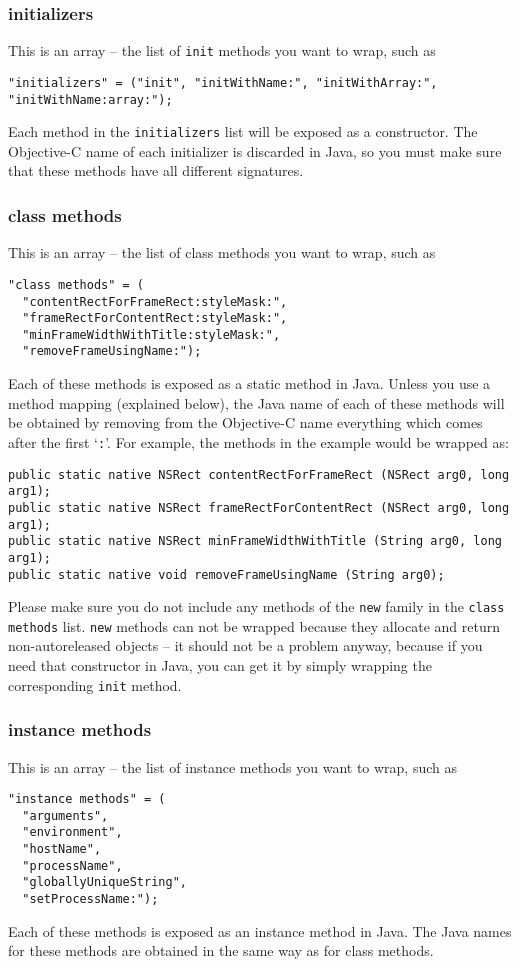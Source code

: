 \subsubsection{initializers}
This is an array -- the list of \texttt{init} methods you want to
wrap, such as
\begin{verbatim}
"initializers" = ("init", "initWithName:", "initWithArray:", "initWithName:array:");
\end{verbatim}
Each method in the \texttt{initializers} list will be exposed as a
constructor.  The Objective-C name of each initializer is discarded 
in Java, so you must make sure that these methods have all different 
signatures.

\subsubsection{class methods}
This is an array -- the list of class methods you want to wrap, such as 
\begin{verbatim}
"class methods" = (
  "contentRectForFrameRect:styleMask:", 
  "frameRectForContentRect:styleMask:", 
  "minFrameWidthWithTitle:styleMask:",
  "removeFrameUsingName:");
\end{verbatim}
Each of these methods is exposed as a static method in Java.  Unless
you use a method mapping (explained below), the Java name of each of
these methods will be obtained by removing from the Objective-C name
everything which comes after the first `\texttt{:}'.  For example, the
methods in the example would be wrapped as:
\begin{verbatim}
public static native NSRect contentRectForFrameRect (NSRect arg0, long arg1);
public static native NSRect frameRectForContentRect (NSRect arg0, long arg1);
public static native NSRect minFrameWidthWithTitle (String arg0, long arg1);
public static native void removeFrameUsingName (String arg0);
\end{verbatim}

Please make sure you do not include any methods of the \texttt{new}
family in the \texttt{class methods} list.  \texttt{new} methods can not
be wrapped because they allocate and return non-autoreleased objects
-- it should not be a problem anyway, because if you need that
constructor in Java, you can get it by simply wrapping the
corresponding \texttt{init} method.

\subsubsection{instance methods}
This is an array -- the list of instance methods you want to wrap,
such as 
\begin{verbatim}
"instance methods" = (
  "arguments",
  "environment",
  "hostName",
  "processName",
  "globallyUniqueString",
  "setProcessName:");
\end{verbatim}
Each of these methods is exposed as an instance method in Java.  The
Java names for these methods are obtained in the same way as for class
methods.

